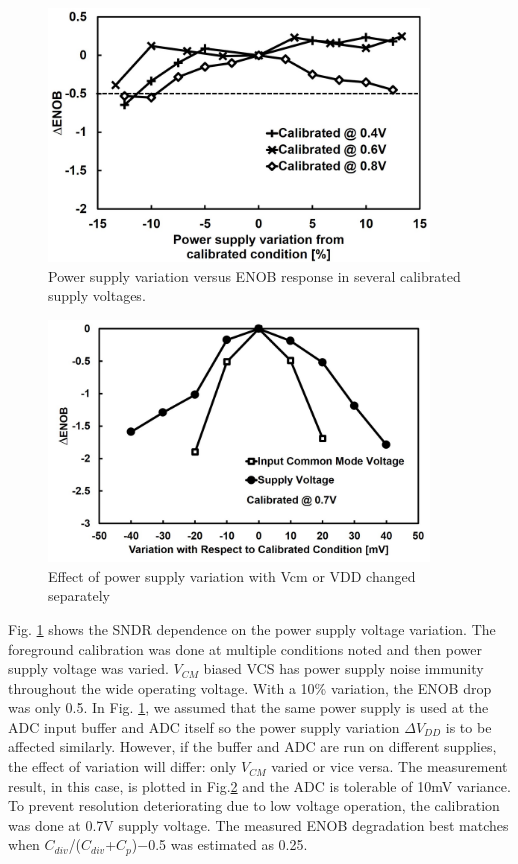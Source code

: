\begin{figure}
\centering
  \includegraphics[width=0.9\textwidth]{figure/chap4/fig15.jpg}
  \caption{Power supply variation versus ENOB response in several calibrated supply voltages.}
  \label{fig-4-15}
\end{figure}
\begin{figure}
\centering
  \includegraphics[width=0.9\textwidth]{figure/chap4/fig16.jpg}
  \caption{Effect of power supply variation with Vcm or VDD changed separately}
  \label{fig-4-16}
\end{figure}

Fig. \ref{fig-4-15} shows the SNDR dependence on the power supply voltage variation. The foreground calibration was done at multiple conditions noted and then power supply voltage was varied. $V_{CM}$ biased VCS has power supply noise immunity throughout the wide operating voltage. With a 10\% variation, the ENOB drop was only 0.5. In Fig. \ref{fig-4-15}, we assumed that the same power supply is used at the ADC input buffer and ADC itself so the power supply variation $\Delta V_{DD}$ is to be affected similarly. However, if the buffer and ADC are run on different supplies, the effect of variation will differ: only $V_{CM}$ varied or vice versa. The measurement result, in this case, is plotted in Fig.\ref{fig-4-16} and the ADC is tolerable of 10mV variance. To prevent resolution deteriorating due to low voltage operation, the calibration was done at 0.7V supply voltage. The measured ENOB degradation best matches when $C_{div}$/($C_{div}$+$C_p$)$-$0.5 was estimated as 0.25.

